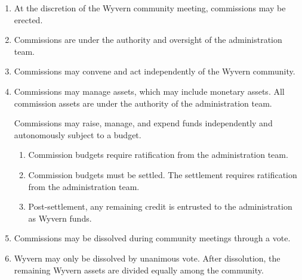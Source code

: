 \begin{enumerate}
    \item At the discretion of the Wyvern community meeting, commissions may be erected.

    \item Commissions are under the authority and oversight of the administration team.

    \item Commissions may convene and act independently of the Wyvern community.

    \item Commissions may manage assets, which may include monetary assets. All commission assets are under the authority of the administration team.

    \begin{item}
            Commissions may raise, manage, and expend funds independently and autonomously subject to a budget.
            \begin{enumerate}
                \item Commission budgets require ratification from the administration team.
                \item Commission budgets must be settled. The settlement requires ratification from the administration team.
                \item Post-settlement, any remaining credit is entrusted to the administration as Wyvern funds.
            \end{enumerate}
    \end{item}

    \item Commissions may be dissolved during community meetings through a vote.

    \item Wyvern may only be dissolved by unanimous vote. After dissolution, the remaining Wyvern assets are divided equally among the community.

\end{enumerate}
